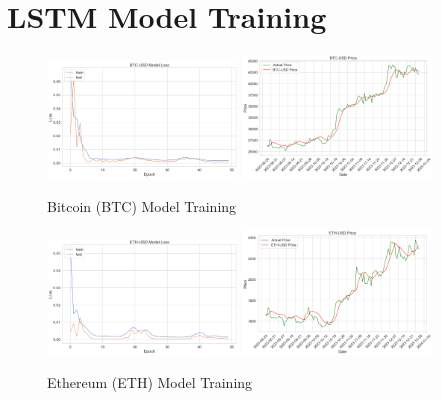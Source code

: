 \pagebreak
\setcounter{section}{3}
\section{LSTM Model Training}\label{appendix:lstm_price_prediction_performance}

\begin{figure}[htbp]
    \centering
    \includegraphics[width=0.45\textwidth]{code/price-prediction/lstm/images/btc_usd_loss.png} %
    \hspace{0.05\textwidth} %
    \includegraphics[width=0.45\textwidth]{code/price-prediction/lstm/images/btc_usd_price.png} %
    \caption{Bitcoin (BTC) Model Training}
    \label{fig:btc}
\end{figure}

\begin{figure}[htbp]
    \centering
    \includegraphics[width=0.45\textwidth]{code/price-prediction/lstm/images/eth_usd_loss.png} %
    \hspace{0.05\textwidth} %
    \includegraphics[width=0.45\textwidth]{code/price-prediction/lstm/images/eth_usd_model.png} %
    \caption{Ethereum (ETH) Model Training}
    \label{fig:eth}
\end{figure}

